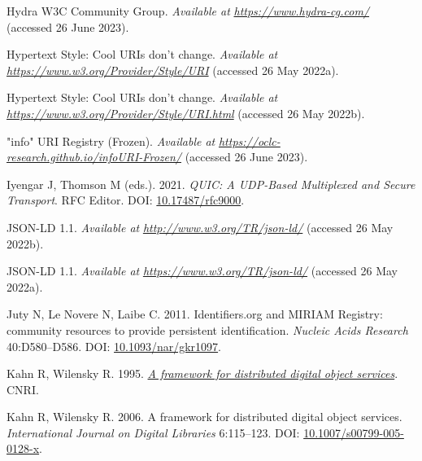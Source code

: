 \begin{CSLReferences}{1}{0}
\leavevmode{}%
Hydra W3C Community Group. \emph{Available at} \href{https://www.hydra-cg.com/}{\emph{https://www.hydra-cg.com/}} (accessed 26 June 2023).

\leavevmode{}%
Hypertext Style: Cool URIs don't change. \emph{Available at} \href{https://www.w3.org/Provider/Style/URI}{\emph{https://www.w3.org/Provider/Style/URI}} (accessed 26 May 2022a).

\leavevmode{}%
Hypertext Style: Cool URIs don't change. \emph{Available at} \href{https://www.w3.org/Provider/Style/URI.html}{\emph{https://www.w3.org/Provider/Style/URI.html}} (accessed 26 May 2022b).

\leavevmode{}%
"info" URI Registry (Frozen). \emph{Available at} \href{https://oclc-research.github.io/infoURI-Frozen/}{\emph{https://oclc-research.github.io/infoURI-Frozen/}} (accessed 26 June 2023).

\leavevmode{}%
Iyengar J, Thomson M (eds.). 2021. \emph{QUIC: A UDP-Based Multiplexed and Secure Transport}. RFC Editor. DOI: \href{https://doi.org/10.17487/rfc9000}{10.17487/rfc9000}.

\leavevmode{}%
JSON-LD 1.1. \emph{Available at} \href{http://www.w3.org/TR/json-ld/}{\emph{http://www.w3.org/TR/json-ld/}} (accessed 26 May 2022b).

\leavevmode{}%
JSON-LD 1.1. \emph{Available at} \href{https://www.w3.org/TR/json-ld/}{\emph{https://www.w3.org/TR/json-ld/}} (accessed 26 May 2022a).

\leavevmode{}%
Juty N, Le Novere N, Laibe C. 2011. Identifiers.org and MIRIAM Registry: community resources to provide persistent identification. \emph{Nucleic Acids Research} 40:D580--D586. DOI: \href{https://doi.org/10.1093/nar/gkr1097}{10.1093/nar/gkr1097}.

\leavevmode{}%
Kahn R, Wilensky R. 1995. \emph{\href{http://www.cnri.reston.va.us/k-w.html}{A framework for distributed digital object services}}. CNRI.

\leavevmode{}%
Kahn R, Wilensky R. 2006. A framework for distributed digital object services. \emph{International Journal on Digital Libraries} 6:115--123. DOI: \href{https://doi.org/10.1007/s00799-005-0128-x}{10.1007/s00799-005-0128-x}.


\end{CSLReferences}
